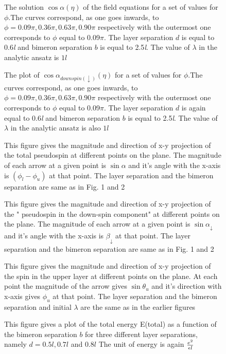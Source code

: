 \begin{figure}
\label{fig1}
\caption{The solution $\cos \alpha (\eta)$ of the field equations  for a set of values for $\phi$.The curves correspond, as one goes inwards, to $\phi = 0.09\pi , 0.36\pi, 0.63\pi, 0.90\pi$ respectively with  the outermost one corresponds to $\phi$ equal to 0.09$\pi$.  The layer separation  $d$ is equal to 0.6{\it l} and bimeron separation $b$ is equal to  2.5{\it l}. The value of $\lambda$ in the analytic ansatz is $1l$ }
\end{figure}

\begin{figure}
\label{fig2}
\caption{The plot of $\cos \alpha_{down spin(\downarrow)} (\eta)$  for a set of values for $\phi$.The curves correspond, as one goes inwards, to $\phi = 0.09\pi , 0.36\pi, 0.63\pi, 0.90\pi$ respectively with  the outermost one corresponds to $\phi$ equal to 0.09$\pi$. The  layer separation  $d$ is again equal to 0.6{\it l} and bimeron separation $b$ is equal to  2.5{\it l}. The value of $\lambda$ in the analytic ansatz is also $1l$}
\end{figure}
\begin{figure}
\label{fig3}
\caption{This figure gives the magnitude and direction  of x-y projection of the total pseudospin   at different points on the plane. The magnitude of each arrow at a given  point is  $\sin \alpha$ and it's angle with the x-axis is $(\phi_{l} - \phi _{u})$ at that point. The layer separation and the bimeron separation are same as in Fig. 1 and 2}
\end{figure}
\begin{figure}
\label{fig4}
\caption{This figure gives the magnitude and direction  of x-y projection of the " pseudospin in the down-spin component"  at different points on the plane. The magnitude of each arrow at a given  point is  $\sin \alpha_{\downarrow}$ and it's angle with the x-axis is   $\beta_{\downarrow}$ at that point. The layer separation and the bimeron separation are same as in Fig. 1 and 2}
\end{figure}
\begin{figure}
\label{fig5}
\caption{This figure gives the magnitude and direction  of x-y projection of the spin in the upper layer  at different points on the plane. At each point the magnitude of the arrow gives $\sin \theta_u$ and it's direction with x-axis gives $\phi_u$ at that point. The layer separation and the bimeron separation and initial $\lambda$ are the same as in the earlier figures}
\end{figure}
\begin{figure}
\label{fig6}
\caption{This figure gives a plot of the total energy E(total) as a function of the bimeron separation $b$ for three different layer separations, namely $d= 0.5l, 0.7l$ and $0.8l$  The unit of energy is again $e^2 \over \epsilon l$}
\end{figure}

